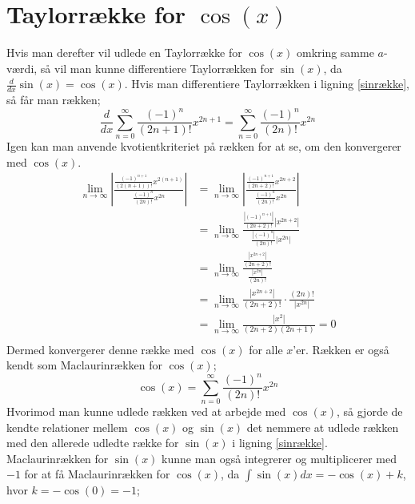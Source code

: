 \section{Taylorrække for $\cos(x)$}
Hvis man derefter vil udlede en Taylorrække for $\cos(x)$ omkring samme $a$-værdi, så vil man kunne differentiere Taylorrækken for $\sin(x)$, da $\frac{d}{dx}\sin(x)=\cos(x)$. Hvis man differentiere Taylorrækken i ligning \ref{sinrække}, så får man rækken;
\[
\frac{d}{dx} \sum_{n=0}^{\infty} \frac{(-1)^n}{(2n+1)!}x^{2n+1}
=
\sum_{n=0}^{\infty} \frac{(-1)^n}{(2n)!}x^{2n}
\]
Igen kan man anvende kvotientkriteriet på rækken for at se, om den konvergerer med $\cos(x)$.
\begin{align*}
\lim\limits_{n \to \infty}
\left\lvert
\frac{\frac{(-1)^{n+1}}{(2(n+1))!}x^{2(n+1)}}
{\frac{(-1)^n}{(2n)!}x^{2n}} 
\right\lvert
&=
\lim\limits_{n \to \infty}
\left\lvert
\frac{\frac{(-1)^{n+1}}{(2n+2)!}x^{2n+2}}
{\frac{(-1)^n}{(2n)!}x^{2n}}
\right\lvert 
\\
&=
\lim\limits_{n \to \infty}
\frac{\frac{\left\lvert (-1)^{n+1} \right\lvert }{(2n+2)!} \left\lvert x^{2n+2} \right\lvert }
{\frac{\left\lvert (-1)^n \right\lvert }{(2n)!} \left\lvert x^{2n} \right\lvert }
\\
&=
\lim\limits_{n \to \infty}
\frac{\frac{\left\lvert x^{2n+2} \right\lvert}{(2n+2)!}}
{\frac{\left\lvert x^{2n} \right\lvert}{(2n)!} }
\\
&=
\lim\limits_{n \to \infty}
\frac{\left\lvert x^{2n+2} \right\lvert}{(2n+2)!}
\cdot
\frac{(2n)!}{\left\lvert x^{2n} \right\lvert}
\\
&=
\lim\limits_{n \to \infty}
\frac{\left\lvert x^{2} \right\lvert}{(2n+2)(2n+1)}
=0 \\
\end{align*}
Dermed konvergerer denne række med $\cos(x)$ for alle $x$'er. Rækken er også kendt som Maclaurinrækken for $\cos(x)$;
\begin{equation}\label{cosrække}
\cos(x)=\sum_{n=0}^{\infty} \frac{(-1)^n}{(2n)!}x^{2n}
\end{equation}
Hvorimod man kunne udlede rækken ved at arbejde med $\cos(x)$, så gjorde de kendte relationer mellem $\cos(x)$ og $\sin(x)$ det nemmere at udlede rækken med den allerede udledte række for $\sin(x)$ i ligning \ref{sinrække}. Maclaurinrækken  for $\sin(x)$ kunne man også integrerer og multiplicerer med $-1$ for at få Maclaurinrækken for $\cos(x)$, da $\int \sin(x) dx=-\cos(x)+k$, hvor $k=-\cos(0)=-1$;
